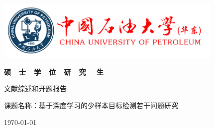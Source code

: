 \pagestyle{empty}


\begin{center}
	\vspace*{5ex}
	\includegraphics[width=11cm]{images/upc.jpg}  
		
	\vspace{1ex}
	\bfseries
	硕\ \ 士\ \ 学\ \ 位\ \ 研\ \ 究 \ \ 生
		
	\vspace{1ex}

	文献综述和开题报告
		
	\vspace{3ex}
	课题名称：基于深度学习的少样本目标检测若干问题研究
	
	\cover	
	\vspace{4ex}
	\underline{\makebox[7cm]{\stuid}}

	\vspace{2ex}
	\underline{\makebox[7cm]{\stuname}}

	\vspace{2ex}
	\underline{\makebox[7cm]{\teaname}}
	
	\vspace{2ex}
	\underline{\makebox[7cm]{\stugrade\stumajor}}

	\vspace{16ex}
	\today
\end{center}

